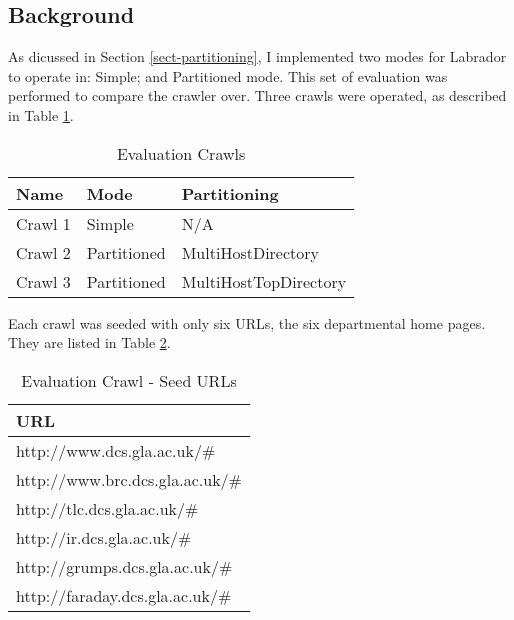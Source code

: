 \subsection{Background}
As dicussed in Section \ref{sect-partitioning}, I implemented two modes for Labrador to operate in: Simple; and Partitioned mode. This set of evaluation was performed to compare the crawler over. Three crawls were operated, as described in Table \ref{tbl-partcrawls}.\\
\begin{table}
\begin{center}
\begin{tabular}{|l|l|l|}
\hline
\bf{Name} & \bf{Mode} & \bf{Partitioning} \\
\hline
Crawl 1 & Simple & N/A \\
\hline
Crawl 2 & Partitioned & MultiHostDirectory \\
\hline
Crawl 3 & Partitioned & MultiHostTopDirectory \\
\hline
\end{tabular}
\end{center}
\caption{Evaluation Crawls}\label{tbl-partcrawls}
\end{table}

Each crawl was seeded with only six URLs, the six departmental home pages. They are listed in Table \ref{tbl-smallseeds}.\\
\begin{table}
\begin{center}
\begin{tabular}{|l|}
\hline
\bf{URL} \\
\hline
http://www.dcs.gla.ac.uk/\# \\
\hline
http://www.brc.dcs.gla.ac.uk/\# \\
\hline
http://tlc.dcs.gla.ac.uk/\# \\
\hline
http://ir.dcs.gla.ac.uk/\# \\
\hline
http://grumps.dcs.gla.ac.uk/\# \\
\hline
http://faraday.dcs.gla.ac.uk/\# \\
\hline
\end{tabular}
\end{center}
\caption{Evaluation Crawl - Seed URLs}\label{tbl-smallseeds}
\end{table}


